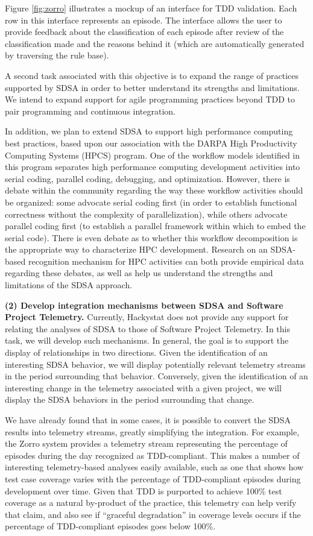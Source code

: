 Figure \ref{fig:zorro} illustrates a mockup of an interface for TDD
validation.  Each row in this interface represents an episode.  The
interface allows the user to provide feedback about the classification of
each episode after review of the classification made and the reasons behind
it (which are automatically generated by traversing the rule base).

A second task associated with this objective is to expand the range of practices
supported by SDSA in order to better understand its strengths and limitations. 
We intend to expand support for agile programming practices beyond TDD to 
pair programming and continuous integration. 

In addition, we plan to extend SDSA to support high performance computing
best practices, based upon our association with the DARPA High Productivity
Computing Systems (HPCS) program.  One of the workflow models identified in
this program separates high performance computing development activities
into serial coding, parallel coding, debugging, and optimization. However,
there is debate within the community regarding the way these workflow
activities should be organized: some advocate serial coding first (in order
to establish functional correctness without the complexity of
parallelization), while others advocate parallel coding first (to establish
a parallel framework within which to embed the serial code).  There is even
debate as to whether this workflow decomposition is the appropriate way to
characterize HPC development.  Research on an SDSA-based recognition
mechanism for HPC activities can both provide empirical data regarding
these debates, as well as help us understand the strengths and limitations
of the SDSA approach.

{\bf (2) Develop integration mechanisms between SDSA and Software
Project Telemetry.}  Currently, Hackystat does not provide any support for
relating the analyses of SDSA to those of Software Project Telemetry.  In
this task, we will develop such mechanisms.  In general, the goal is to
support the display of relationships in two directions. Given the
identification of an interesting SDSA behavior, we will display
potentially relevant telemetry streams in the period surrounding that
behavior.  Conversely, given the identification of an interesting change in
the telemetry associated with a given project, we will display the
SDSA behaviors in the period surrounding that change.  

We have already found that in some cases, it is possible to convert the
SDSA results into telemetry streams, greatly simplifying the
integration. For example, the Zorro system provides a telemetry stream
representing the percentage of episodes during the day recognized as
TDD-compliant. This makes a number of interesting telemetry-based analyses
easily available, such as one that shows how test case coverage varies with
the percentage of TDD-compliant episodes during development over time.
Given that TDD is purported to achieve 100\% test coverage as a natural
by-product of the practice, this telemetry can help verify that claim, and
also see if ``graceful degradation'' in coverage levels occurs if the percentage
of TDD-compliant episodes goes below 100\%.

